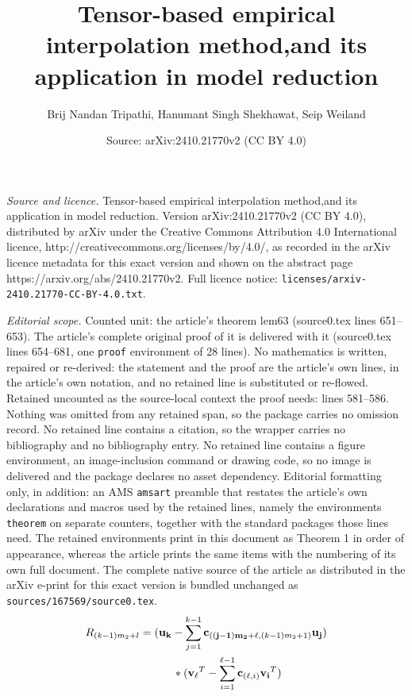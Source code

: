 \documentclass[10pt,a4paper]{amsart}
\title{Tensor-based empirical interpolation method,\newline and its application in model reduction}
\author{Brij Nandan Tripathi, Hanumant Singh Shekhawat, Seip Weiland}
\date{Source: arXiv:2410.21770v2 (CC BY 4.0)}
\begin{document}
\maketitle

\noindent\emph{Source and licence.} Tensor-based empirical interpolation method,\newline and its application in model reduction. Version arXiv:2410.21770v2 (CC BY 4.0), distributed by arXiv under the Creative Commons Attribution 4.0 International licence, http://creativecommons.org/licenses/by/4.0/, as recorded in the arXiv licence metadata for this exact version and shown on the abstract page https://arxiv.org/abs/2410.21770v2. Full licence notice: \texttt{licenses/arxiv-2410.21770-CC-BY-4.0.txt}.\par\smallskip

\noindent\textit{Editorial scope.} Counted unit: the article's theorem lem63 (source0.tex lines 651--653). The article's complete original proof of it is delivered with it (source0.tex lines 654--681, one \texttt{proof} environment of 28 lines). No mathematics is written, repaired or re-derived: the statement and the proof are the article's own lines, in the article's own notation, and no retained line is substituted or re-flowed.  Retained uncounted as the source-local context the proof needs: lines 581--586.  Nothing was omitted from any retained span, so the package carries no omission record.  No retained line contains a citation, so the wrapper carries no bibliography and no bibliography entry.  No retained line contains a figure environment, an image-inclusion command or drawing code, so no image is delivered and the package declares no asset dependency.  Editorial formatting only, in addition: an AMS \texttt{amsart} preamble that restates the article's own declarations and macros used by the retained lines, namely the environments \texttt{theorem} on separate counters, together with the standard packages those lines need.  The retained environments print in this document as Theorem 1 in order of appearance, whereas the article prints the same items with the numbering of its own full document.  The complete native source of the article as distributed in the arXiv e-print for this exact version is bundled unchanged as \texttt{sources/167569/source0.tex}.
\begin{equation}\label{eq511}
     \begin{split}
         R_{(k-1)m_2+l}&=(\bold{u_k}-\sum_{j=1}^{k-1}\bold{c}_{\bold{((j-1)m_2+\ell},(k-1)m_2+1)}\bold{u_j})\\
                        &\quad\quad\quad*(\bold{v_\ell}^T-\sum_{i=1}^{\ell-1}\bold{c}_{(\bold{\ell},i)}\bold{v_i}^T)
     \end{split}
 \end{equation}
\end{document}
